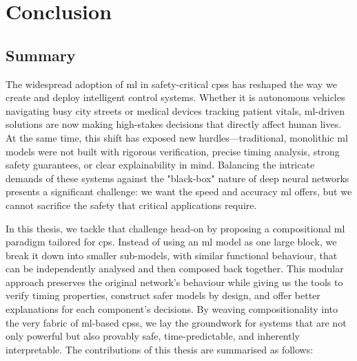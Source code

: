 \chapter{Conclusion} \label{chapter:conclusion}
\glsresetall


\section{Summary}

The widespread adoption of \gls{ml} in safety-critical \glspl{cps} has reshaped the way we create and deploy intelligent control systems. Whether it is autonomous vehicles navigating busy city streets or medical devices tracking patient vitals, \gls{ml}-driven solutions are now making high-stakes decisions that directly affect human lives. At the same time, this shift has exposed new hurdles—traditional, monolithic \gls{ml} models were not built with rigorous verification, precise timing analysis, strong safety guarantees, or clear explainability in mind. Balancing the intricate demands of these systems against the "black-box" nature of deep neural networks presents a significant challenge: we want the speed and accuracy \gls{ml} offers, but we cannot sacrifice the safety that critical applications require.

In this thesis, we tackle that challenge head-on by proposing a compositional \gls{ml} paradigm tailored for \gls{cps}. Instead of using an \gls{ml} model as one large block, we break it down into smaller sub-models, with similar functional behaviour, that can be independently analysed and then composed back together. This modular approach preserves the original network's behaviour while giving us the tools to verify timing properties, construct safer models by design, and offer better explanations for each component's decisions. By weaving compositionality into the very fabric of \gls{ml}-based \glspl{cps}, we lay the groundwork for systems that are not only powerful but also provably safe, time-predictable, and inherently interpretable. The contributions of this thesis are summarised as follows:

